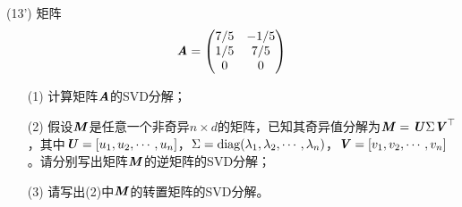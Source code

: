 \documentclass[12pt,a4paper,openany,twoside]{ctexbook}
\begin{document}
\begin{exercise}(13')
	矩阵\[ \boldsymbol{\mathit{A}} = \begin{pmatrix}
		7/5&-1/5\\
		1/5&7/5\\
		0&0
	\end{pmatrix}
 \]
 \begin{itemize}
 	\item [(1)] 计算矩阵$ \boldsymbol{\mathit{A}} $的SVD分解；
 	\item [(2)] 假设$\boldsymbol{\mathit{M}}$是任意一个非奇异$n \times d$的矩阵，已知其奇异值分解为$\boldsymbol{\mathit{M}} = \boldsymbol{\mathit{U}} \Sigma \boldsymbol{\mathit{V}}^\top$，其中$\boldsymbol{\mathit{U}} = [u_1, u_2, \cdots, u_n]$，$\Sigma = \mathop{\rm diag}\nolimits(\lambda_1, \lambda_2, \cdots, \lambda_n)$，$\boldsymbol{\mathit{V}} = [v_1, v_2, \cdots, v_n]$。请分别写出矩阵$\boldsymbol{\mathit{M}}$的逆矩阵的SVD分解；
 	\item [(3)] 请写出(2)中$\boldsymbol{\mathit{M}}$的转置矩阵的SVD分解。
 \end{itemize}
\end{exercise}
%		
%
\end{document}
